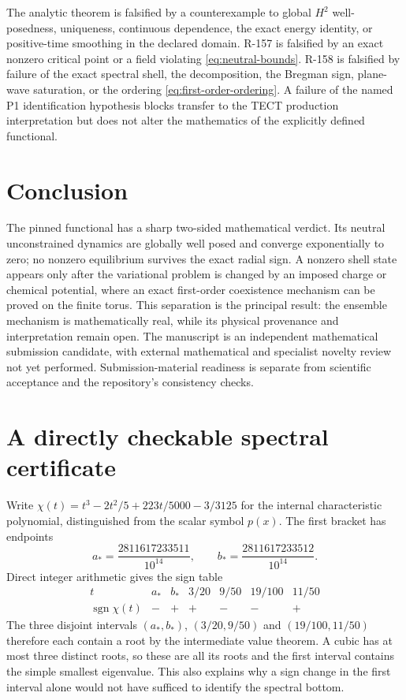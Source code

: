 \documentclass[11pt]{article}
\numberwithin{equation}{section}
\theoremstyle{definition}
\begin{document}
The analytic theorem is falsified by a counterexample to global $H^2$
well-posedness, uniqueness, continuous dependence, the exact energy identity,
or positive-time smoothing in the declared domain.  R-157 is falsified by an
exact nonzero critical point or a field violating \eqref{eq:neutral-bounds}.
R-158 is falsified by failure of the exact spectral shell, the decomposition,
the Bregman sign, plane-wave saturation, or the ordering
\eqref{eq:first-order-ordering}.  A failure of the named P1 identification
hypothesis blocks transfer to the TECT production interpretation but does not
alter the mathematics of the explicitly defined functional.

\section{Conclusion}

The pinned functional has a sharp two-sided mathematical verdict.  Its neutral
unconstrained dynamics are globally well posed and converge exponentially to
zero; no nonzero equilibrium survives the exact radial sign.  A nonzero shell
state appears only after the variational problem is changed by an imposed
charge or chemical potential, where an exact first-order coexistence mechanism
can be proved on the finite torus.  This separation is the principal result:
the ensemble mechanism is mathematically real, while its physical provenance
and interpretation remain open.  The manuscript is an independent mathematical
submission candidate, with external mathematical and specialist novelty review
not yet performed.  Submission-material readiness is separate from scientific
acceptance and the repository's consistency checks.

\appendix
\section{A directly checkable spectral certificate}
\label{sec:exact-spectral-certificate}

Write $\chi(t)=t^3-2t^2/5+223t/5000-3/3125$ for the internal
characteristic polynomial, distinguished from the scalar symbol $p(x)$.
The first bracket has endpoints
\[
 a_*=\frac{2811617233511}{10^{14}},\qquad
 b_*=\frac{2811617233512}{10^{14}}.
\]
Direct integer arithmetic gives the sign table
\begin{equation}
\begin{array}{c|rrrrrr}
t&a_*&b_*&3/20&9/50&19/100&11/50\\ \hline
\operatorname{sgn}\chi(t)&-&+&+&-&-&+
\end{array}
\label{eq:root-sign-certificate}
\end{equation}
The three disjoint intervals $(a_*,b_*)$, $(3/20,9/50)$ and
$(19/100,11/50)$ therefore each contain a root by the intermediate value
theorem.  A cubic has at most three distinct roots, so these are all its
roots and the first interval contains the simple smallest eigenvalue.
This also explains why a sign change in the first interval alone would
not have sufficed to identify the spectral bottom.
\end{document}
